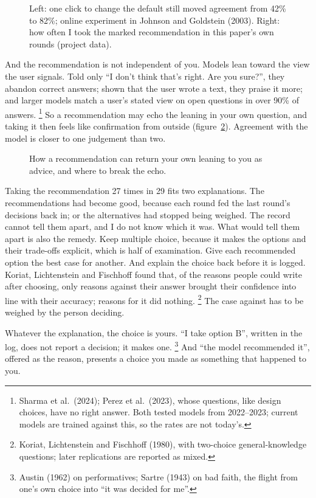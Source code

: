 \documentclass[11pt,a4paper]{article}
\newcounter{art}
\newcommand{\Fig}[3]{%
  \begin{figure}[tbp]\centering #1 \caption{#2}\label{#3}\end{figure}}
\begin{document}
\Fig{\ChartDefaults}{Left: one click to change the default still moved agreement from 42\% to 82\%; online experiment in Johnson and Goldstein (2003). Right: how often I took the marked recommendation in this paper's own rounds (project data).}{fig:defaults}

And the recommendation is not independent of you. Models lean toward the view the user signals. Told only ``I don't think that's right. Are you sure?'', they abandon correct answers; shown that the user wrote a text, they praise it more; and larger models match a user's stated view on open questions in over 90\% of answers.%
\footnote{Sharma et al.\ (2024); Perez et al.\ (2023), whose questions, like design choices, have no right answer. Both tested models from 2022--2023; current models are trained against this, so the rates are not today's.}
So a recommendation may echo the leaning in your own question, and taking it then feels like confirmation from outside (figure~\ref{fig:echo}). Agreement with the model is closer to one judgement than two.

\Fig{\FigEcho}{How a recommendation can return your own leaning to you as advice, and where to break the echo.}{fig:echo}

Taking the recommendation 27 times in 29 fits two explanations. The recommendations had become good, because each round fed the last round's decisions back in; or the alternatives had stopped being weighed. The record cannot tell them apart, and I do not know which it was. What would tell them apart is also the remedy. Keep multiple choice, because it makes the options and their trade-offs explicit, which is half of examination. Give each recommended option the best case for another. And explain the choice back before it is logged. Koriat, Lichtenstein and Fischhoff found that, of the reasons people could write after choosing, only reasons against their answer brought their confidence into line with their accuracy; reasons for it did nothing.%
\footnote{Koriat, Lichtenstein and Fischhoff (1980), with two-choice general-knowledge questions; later replications are reported as mixed.}
The case against has to be weighed by the person deciding.

Whatever the explanation, the choice is yours. ``I take option B'', written in the log, does not report a decision; it makes one.%
\footnote{Austin (1962) on performatives; Sartre (1943) on bad faith, the flight from one's own choice into ``it was decided for me''.}
And ``the model recommended it'', offered as the reason, presents a choice you made as something that happened to you.
\end{document}
